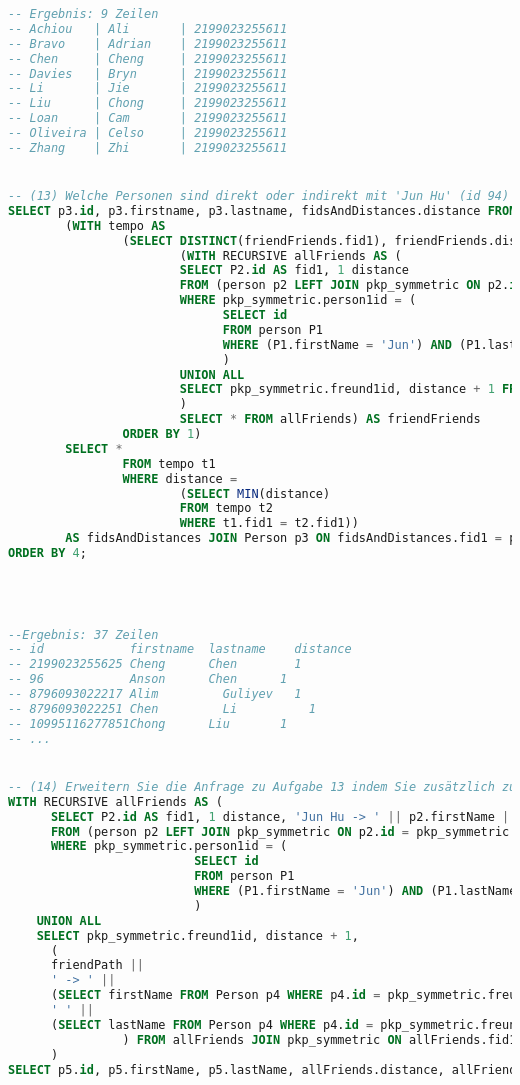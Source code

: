 \begin{lstlisting}[language=sql]
-- Ergebnis: 9 Zeilen
-- Achiou   | Ali       | 2199023255611
-- Bravo    | Adrian    | 2199023255611
-- Chen     | Cheng     | 2199023255611
-- Davies   | Bryn      | 2199023255611
-- Li       | Jie       | 2199023255611
-- Liu      | Chong     | 2199023255611
-- Loan     | Cam       | 2199023255611
-- Oliveira | Celso     | 2199023255611
-- Zhang    | Zhi       | 2199023255611


-- (13) Welche Personen sind direkt oder indirekt mit 'Jun Hu' (id 94) verbunden (befreundet)? Geben Sie für jede Person die Distanz zu Jun an.
SELECT p3.id, p3.firstname, p3.lastname, fidsAndDistances.distance FROM
        (WITH tempo AS
                (SELECT DISTINCT(friendFriends.fid1), friendFriends.distance FROM
                        (WITH RECURSIVE allFriends AS (
                        SELECT P2.id AS fid1, 1 distance
                        FROM (person p2 LEFT JOIN pkp_symmetric ON p2.id = pkp_symmetric.freund1id)
                        WHERE pkp_symmetric.person1id = (
                              SELECT id
                              FROM person P1
                              WHERE (P1.firstName = 'Jun') AND (P1.lastName = 'Hu')
                              )
                        UNION ALL
                        SELECT pkp_symmetric.freund1id, distance + 1 FROM allFriends JOIN pkp_symmetric ON allFriends.fid1=pkp_symmetric.person1id
                        )
                        SELECT * FROM allFriends) AS friendFriends
                ORDER BY 1)
        SELECT *
                FROM tempo t1
                WHERE distance =
                        (SELECT MIN(distance)
                        FROM tempo t2
                        WHERE t1.fid1 = t2.fid1))
        AS fidsAndDistances JOIN Person p3 ON fidsAndDistances.fid1 = p3.id
ORDER BY 4;




--Ergebnis: 37 Zeilen
-- id 	         firstname 	lastname 	distance
-- 2199023255625 Cheng      Chen	    1
-- 96            Anson	    Chen      1
-- 8796093022217 Alim	      Guliyev   1
-- 8796093022251 Chen	      Li	      1
-- 10995116277851Chong	    Liu       1
-- ...


-- (14) Erweitern Sie die Anfrage zu Aufgabe 13 indem Sie zusätzlich zur Distanz den Pfad zwischen den Nutzern ausgeben.
WITH RECURSIVE allFriends AS (
      SELECT P2.id AS fid1, 1 distance, 'Jun Hu -> ' || p2.firstName || ' ' || p2.lastName  friendPath
      FROM (person p2 LEFT JOIN pkp_symmetric ON p2.id = pkp_symmetric.freund1id)
      WHERE pkp_symmetric.person1id = (
                          SELECT id
                          FROM person P1
                          WHERE (P1.firstName = 'Jun') AND (P1.lastName = 'Hu')
                          )
    UNION ALL
    SELECT pkp_symmetric.freund1id, distance + 1,
      (
      friendPath ||
      ' -> ' ||
      (SELECT firstName FROM Person p4 WHERE p4.id = pkp_symmetric.freund1id) ||
      ' ' ||
      (SELECT lastName FROM Person p4 WHERE p4.id = pkp_symmetric.freund1id)
                ) FROM allFriends JOIN pkp_symmetric ON allFriends.fid1=pkp_symmetric.person1id
      )
SELECT p5.id, p5.firstName, p5.lastName, allFriends.distance, allFriends.friendPath FROM allFriends JOIN Person p5 on allfriends.fid1 = p5.id;


\end{lstlisting}
